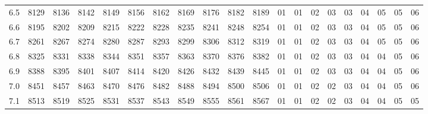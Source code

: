\documentclass[12pt,UTF8]{ctexbook}
\begin{document}
\begin{appendix}
\begin{longtable}{|c| c c c c c | c c c c c| c c c c c c c c c|}
\scriptsize 6.5 & \scriptsize 8129 & \scriptsize 8136 & \scriptsize 8142 & \scriptsize 8149 & \scriptsize 8156 & \scriptsize 8162 & \scriptsize 8169 & \scriptsize 8176 & \scriptsize 8182 & \scriptsize 8189 & \scriptsize 01 & \scriptsize 01 & \scriptsize 02 & \scriptsize 03 & \scriptsize 03 & \scriptsize 04 & \scriptsize 05 & \scriptsize 05 & \scriptsize 06 \\
\scriptsize 6.6 & \scriptsize 8195 & \scriptsize 8202 & \scriptsize 8209 & \scriptsize 8215 & \scriptsize 8222 & \scriptsize 8228 & \scriptsize 8235 & \scriptsize 8241 & \scriptsize 8248 & \scriptsize 8254 & \scriptsize 01 & \scriptsize 01 & \scriptsize 02 & \scriptsize 03 & \scriptsize 03 & \scriptsize 04 & \scriptsize 05 & \scriptsize 05 & \scriptsize 06 \\
\scriptsize 6.7 & \scriptsize 8261 & \scriptsize 8267 & \scriptsize 8274 & \scriptsize 8280 & \scriptsize 8287 & \scriptsize 8293 & \scriptsize 8299 & \scriptsize 8306 & \scriptsize 8312 & \scriptsize 8319 & \scriptsize 01 & \scriptsize 01 & \scriptsize 02 & \scriptsize 03 & \scriptsize 03 & \scriptsize 04 & \scriptsize 05 & \scriptsize 05 & \scriptsize 06 \\
\scriptsize 6.8 & \scriptsize 8325 & \scriptsize 8331 & \scriptsize 8338 & \scriptsize 8344 & \scriptsize 8351 & \scriptsize 8357 & \scriptsize 8363 & \scriptsize 8370 & \scriptsize 8376 & \scriptsize 8382 & \scriptsize 01 & \scriptsize 01 & \scriptsize 02 & \scriptsize 03 & \scriptsize 03 & \scriptsize 04 & \scriptsize 04 & \scriptsize 05 & \scriptsize 06 \\
\scriptsize 6.9 & \scriptsize 8388 & \scriptsize 8395 & \scriptsize 8401 & \scriptsize 8407 & \scriptsize 8414 & \scriptsize 8420 & \scriptsize 8426 & \scriptsize 8432 & \scriptsize 8439 & \scriptsize 8445 & \scriptsize 01 & \scriptsize 01 & \scriptsize 02 & \scriptsize 03 & \scriptsize 03 & \scriptsize 04 & \scriptsize 04 & \scriptsize 05 & \scriptsize 06 \\
\scriptsize 7.0 & \scriptsize 8451 & \scriptsize 8457 & \scriptsize 8463 & \scriptsize 8470 & \scriptsize 8476 & \scriptsize 8482 & \scriptsize 8488 & \scriptsize 8494 & \scriptsize 8500 & \scriptsize 8506 & \scriptsize 01 & \scriptsize 01 & \scriptsize 02 & \scriptsize 02 & \scriptsize 03 & \scriptsize 04 & \scriptsize 04 & \scriptsize 05 & \scriptsize 06 \\
\scriptsize 7.1 & \scriptsize 8513 & \scriptsize 8519 & \scriptsize 8525 & \scriptsize 8531 & \scriptsize 8537 & \scriptsize 8543 & \scriptsize 8549 & \scriptsize 8555 & \scriptsize 8561 & \scriptsize 8567 & \scriptsize 01 & \scriptsize 01 & \scriptsize 02 & \scriptsize 02 & \scriptsize 03 & \scriptsize 04 & \scriptsize 04 & \scriptsize 05 & \scriptsize 05 \\

\end{longtable}
\end{appendix}
\end{document}
